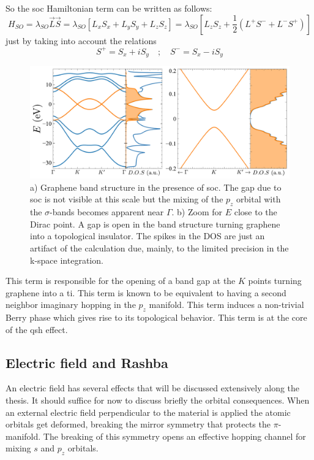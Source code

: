 So the \ac{soc} Hamiltonian term can be written as follows:
\begin{equation}
   H_{SO}= \lambda_{SO}\vec{L}\vec{S} =
   \lambda_{SO}\left[L_xS_x + L_yS_y + L_zS_z \right] =
   \lambda_{SO}\left[L_zS_z+
   \frac{1}{2}\left(L^{+}S^{-}+L^{-}S^{+}\right)\right]
\label{soc}
\end{equation}
just by taking into account the relations
\begin{equation*}
   S^{+} = S_x + iS_y \quad;\quad
   S^{-} = S_x - iS_y
\end{equation*}

\begin{figure}[!ht]
\centering
\includegraphics{graphene/figures/banddos_SOC.pdf}
\vspace{-5pt}
\caption{a) Graphene band structure in the presence of \ac{soc}. The gap due to \ac{soc} is not visible at this scale but the mixing of the $p_z$ orbital with the $\sigma$-bands becomes apparent near $\Gamma$. b) Zoom for $E$ close to the Dirac point. A gap is open in the band structure turning graphene into a topological insulator. The spikes in the DOS are just an artifact of the calculation due, mainly, to the limited precision in the k-space integration.}
\label{fig:SOC}
\end{figure}
\FloatBarrier

This term is responsible for the opening of a band gap at the $K$ points turning graphene into a \ac{ti}. %
This term is known to be equivalent to having a second neighbor imaginary hopping in the $p_z$ manifold\cite{Haldane1988,Kane2005,Kane2005a}. This term induces a non-trivial Berry phase which gives rise to its topological behavior.
This term is at the core of the \ac{qsh} effect. %


\subsection{Electric field and Rashba}  %
An electric field has several effects that will be discussed extensively along the thesis. It should suffice for now to discuss briefly the orbital consequences.
When an external electric field perpendicular to the material is applied the atomic orbitals get deformed, breaking the mirror symmetry that protects the $\pi$-manifold. The breaking of this symmetry opens an effective hopping channel for mixing $s$ and $p_z$ orbitals.

